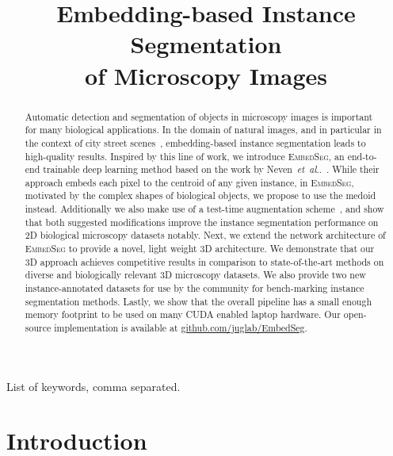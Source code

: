 \documentclass{midl} %
\title[Embedding-based Instance Segmentation of Microscopy Images]{Embedding-based Instance Segmentation \\of Microscopy Images}
\makeatletter
\newcommand{\EmbedSeg}{\mbox{\textsc{EmbedSeg}}\xspace}
\DeclareRobustCommand\onedot{\futurelet\@let@token\@onedot}
\def\@onedot{\ifx\@let@token.\else.\null\fi\xspace}
\def\etal{\emph{et~al}\onedot}
\makeatother
\begin{document}
\maketitle

\begin{abstract}
Automatic detection and segmentation of objects in microscopy images is important for many biological applications.
In the domain of natural images, and in particular in the context of city street scenes~\cite{Cordts2016Cityscapes}, embedding-based instance segmentation leads to high-quality results.
Inspired by this line of work, we introduce \EmbedSeg, an end-to-end trainable deep learning method based on the work by Neven~\etal~\cite{neven2019}. While their approach embeds each pixel to the centroid of any given instance, in \EmbedSeg, motivated by the complex shapes of biological objects, we propose to use the medoid instead.
Additionally we also make use of a test-time augmentation scheme~\cite{wang2019,stringer2020}, and show that both suggested modifications improve the instance segmentation performance on 2D biological microscopy datasets notably.
 Next, we extend the network architecture of \EmbedSeg to provide a novel, light weight 3D architecture. 
 We demonstrate that our 3D approach achieves competitive results in comparison to state-of-the-art methods on diverse and biologically relevant 3D microscopy datasets.
We also provide two new instance-annotated datasets for use by the community for bench-marking instance segmentation methods.
Lastly, we show that the overall pipeline has a small enough memory footprint to be used on many CUDA enabled laptop hardware.
Our open-source implementation is available at \url{github.com/juglab/EmbedSeg}.
\end{abstract}

\begin{keywords}
List of keywords, comma separated.
\end{keywords}

\section{Introduction}
\end{document}
